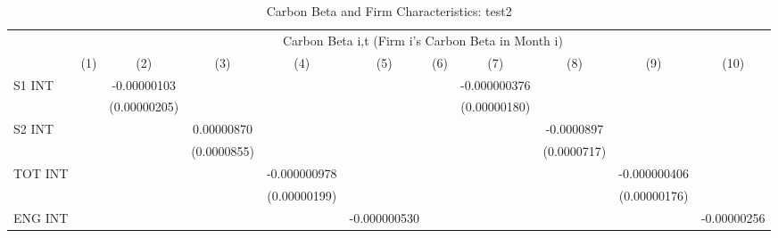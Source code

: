 \begin{table}[htbp]\centering
\def\sym#1{\ifmmode^{#1}\else\(^{#1}\)\fi}
\caption{Carbon Beta and Firm Characteristics: test2}
\begin{tabular}{l*{10}{c}}
\hline\hline
                &\multicolumn{10}{c}{Carbon Beta i,t (Firm i's Carbon Beta in Month i)}                                                                                                                       \\\cmidrule(lr){2-11}
                &\multicolumn{1}{c}{(1)}         &\multicolumn{1}{c}{(2)}         &\multicolumn{1}{c}{(3)}         &\multicolumn{1}{c}{(4)}         &\multicolumn{1}{c}{(5)}         &\multicolumn{1}{c}{(6)}         &\multicolumn{1}{c}{(7)}         &\multicolumn{1}{c}{(8)}         &\multicolumn{1}{c}{(9)}         &\multicolumn{1}{c}{(10)}         \\
\hline
S1 INT          &                  &-0.00000103         &                  &                  &                  &                  &-0.000000376         &                  &                  &                  \\
                &                  &(0.00000205)         &                  &                  &                  &                  &(0.00000180)         &                  &                  &                  \\
S2 INT          &                  &                  &0.00000870         &                  &                  &                  &                  &-0.0000897         &                  &                  \\
                &                  &                  &(0.0000855)         &                  &                  &                  &                  &(0.0000717)         &                  &                  \\
TOT INT         &                  &                  &                  &-0.000000978         &                  &                  &                  &                  &-0.000000406         &                  \\
                &                  &                  &                  &(0.00000199)         &                  &                  &                  &                  &(0.00000176)         &                  \\
ENG INT         &                  &                  &                  &                  &-0.000000530         &                  &                  &                  &                  &-0.00000256         \\

\end{tabular}
\end{table}
